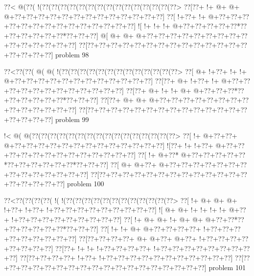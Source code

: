 \vbox{\vbox{\goo
\0??<\- @(\0??(\- !(\0??(\0??(\0??(\0??(\0??(\0??(\0??(\0??(\0??(\0??(\0??(\0??(\0??(\0??(\0??>
\0??[\0??+\- !+\- @+\- @+\- @+\0??+\0??+\0??+\0??+\0??+\0??+\0??+\0??+\0??+\0??+\0??+\0??+\0??]
\0??[\- !+\0??+\- !+\- @+\0??+\0??+\0??+\0??+\0??+\0??+\0??+\0??+\0??+\0??+\0??+\0??+\0??+\0??]
\- ![\- !+\- !+\- !+\- @+\0??+\0??+\0??+\0??+\0??*\0??+\0??+\0??+\0??+\0??+\0??*\0??+\0??+\0??]
\- @[\- @+\- @+\- @+\0??+\0??+\0??+\0??+\0??+\0??+\0??+\0??+\0??+\0??+\0??+\0??+\0??+\0??+\0??]
\0??[\0??+\0??+\0??+\0??+\0??+\0??+\0??+\0??+\0??+\0??+\0??+\0??+\0??+\0??+\0??+\0??+\0??+\0??]
}
\hfil problem 98\hfil\break
}



\vbox{\vbox{\goo
\0??<\0??(\0??(\- @(\- @(\- !(\0??(\0??(\0??(\0??(\0??(\0??(\0??(\0??(\0??(\0??(\0??(\0??(\0??>
\0??[\- @+\- !+\0??+\- !+\- !+\- @+\0??+\0??+\0??+\0??+\0??+\0??+\0??+\0??+\0??+\0??+\0??+\0??]
\0??[\0??+\- @+\- !+\0??+\- !+\- @+\0??+\0??+\0??+\0??+\0??+\0??+\0??+\0??+\0??+\0??+\0??+\0??]
\0??[\0??+\- @+\- !+\- !+\- @+\- @+\0??+\0??+\0??*\0??+\0??+\0??+\0??+\0??+\0??*\0??+\0??+\0??]
\0??[\0??+\- @+\- @+\- @+\0??+\0??+\0??+\0??+\0??+\0??+\0??+\0??+\0??+\0??+\0??+\0??+\0??+\0??]
\0??[\0??+\0??+\0??+\0??+\0??+\0??+\0??+\0??+\0??+\0??+\0??+\0??+\0??+\0??+\0??+\0??+\0??+\0??]
}
\hfil problem 99\hfil\break
}



\vbox{\vbox{\goo
\- !<\- @(\- @(\0??(\0??(\0??(\0??(\0??(\0??(\0??(\0??(\0??(\0??(\0??(\0??(\0??(\0??(\0??(\0??>
\0??[\- !+\- @+\0??+\0??+\- @+\0??+\0??+\0??+\0??+\0??+\0??+\0??+\0??+\0??+\0??+\0??+\0??+\0??]
\- ![\0??+\- !+\- !+\0??+\- @+\0??+\0??+\0??+\0??+\0??+\0??+\0??+\0??+\0??+\0??+\0??+\0??+\0??]
\0??[\- !+\- @+\0??*\- @+\0??+\0??+\0??+\0??+\0??*\0??+\0??+\0??+\0??+\0??+\0??*\0??+\0??+\0??]
\0??[\- @+\- @+\0??+\- @+\0??+\0??+\0??+\0??+\0??+\0??+\0??+\0??+\0??+\0??+\0??+\0??+\0??+\0??]
\0??[\0??+\0??+\0??+\0??+\0??+\0??+\0??+\0??+\0??+\0??+\0??+\0??+\0??+\0??+\0??+\0??+\0??+\0??]
}
\hfil problem 100\hfil\break
}



\vbox{\vbox{\goo
\0??<\0??(\0??(\0??(\0??(\- !(\- !(\0??(\0??(\0??(\0??(\0??(\0??(\0??(\0??(\0??(\0??(\0??(\0??>
\0??[\- !+\- @+\- @+\- @+\- !+\0??+\- !+\0??+\- !+\0??+\0??+\0??+\0??+\0??+\0??+\0??+\0??+\0??]
\- ![\- @+\- @+\- !+\- !+\- !+\- !+\- @+\0??+\- !+\0??+\0??+\0??+\0??+\0??+\0??+\0??+\0??+\0??]
\0??[\- !+\- @+\- @+\- !+\- @+\- @+\- @+\0??+\0??*\0??+\0??+\0??+\0??+\0??+\0??*\0??+\0??+\0??]
\0??[\- !+\- !+\- @+\- @+\0??+\0??+\0??+\0??+\- !+\0??+\0??+\0??+\0??+\0??+\0??+\0??+\0??+\0??]
\0??[\0??+\0??+\0??+\0??+\- @+\- @+\0??+\- @+\0??+\- !+\0??+\0??+\0??+\0??+\0??+\0??+\0??+\0??]
\0??[\0??+\- !+\- !+\- !+\0??+\0??+\0??+\0??+\- !+\0??+\0??+\0??+\0??+\0??+\0??+\0??+\0??+\0??]
\0??[\0??+\0??+\0??+\0??+\- !+\0??+\- !+\0??+\0??+\0??+\0??+\0??+\0??+\0??+\0??+\0??+\0??+\0??]
\0??[\0??+\0??+\0??+\0??+\0??+\0??+\0??+\0??+\0??+\0??+\0??+\0??+\0??+\0??+\0??+\0??+\0??+\0??]
}
\hfil problem 101\hfil\break
}



